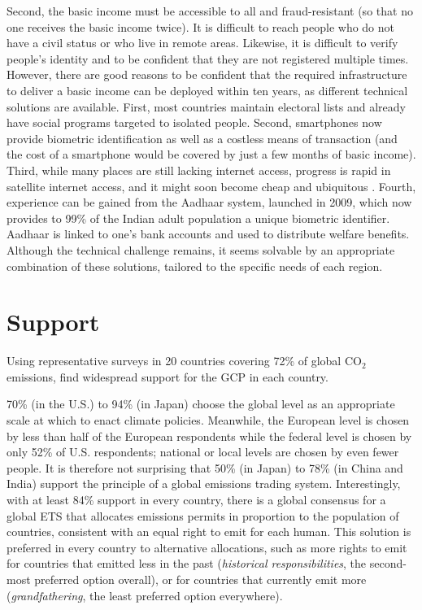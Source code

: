 \documentclass[12pt,english]{article}
\begin{document}
Second, the basic income must be accessible to all and fraud-resistant (so that no one receives the basic income twice). It is difficult to reach people who do not have a civil status or who live in remote areas. Likewise, it is difficult to verify people's identity and to be confident that they are not registered multiple times. However, there are good reasons to be confident that the required infrastructure to deliver a basic income can be deployed within ten years, as different technical solutions are available. First, most countries maintain electoral lists and already have social programs targeted to isolated people. Second, smartphones now provide biometric identification as well as a costless means of transaction (and the cost of a smartphone would be covered by just a few months of basic income). Third, while many places are still lacking internet access, progress is rapid in satellite internet access, and it might soon become cheap and ubiquitous \citep{hanson_satellite_2016}. Fourth, experience can be gained from the Aadhaar system, launched in 2009, which now provides to 99\% of the Indian adult population a unique biometric identifier. Aadhaar is linked to one's bank accounts and used to distribute welfare benefits. Although the technical challenge remains, it seems solvable by an appropriate combination of these solutions, tailored to the specific needs of each region. 

\section{Support}\label{sec:support}

Using representative surveys in 20 countries covering 72\% of global CO$_\text{2}$ emissions, \citet{fabre_international_2023} find widespread support for the GCP in each country. 

70\% (in the U.S.) to 94\% (in Japan) choose the global level as an appropriate scale at which to enact climate policies. Meanwhile, the European level is chosen by less than half of the European respondents while the federal level is chosen by only 52\% of U.S. respondents; national or local levels are chosen by even fewer people. It is therefore not surprising that 50\% (in Japan) to 78\% (in China and India) %
support the principle of a global emissions trading system. 
Interestingly, with at least 84\% support in every country, %
there is a global consensus for a global ETS that allocates emissions permits in proportion to the population of countries, consistent with an equal right to emit for each human. This solution is preferred in every country to alternative allocations, such as more rights to emit for countries that emitted less in the past (\textit{historical responsibilities}, the second-most preferred option overall), or for countries that currently emit more (\textit{grandfathering}, the least preferred option everywhere). 
\end{document}
